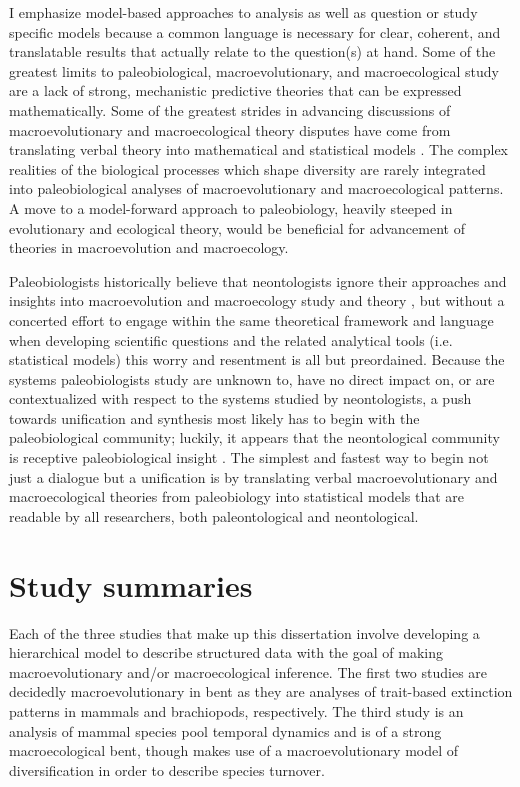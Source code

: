 I emphasize model-based approaches to analysis as well as question or study specific models because a common language is necessary for clear, coherent, and translatable results that actually relate to the question(s) at hand. Some of the greatest limits to paleobiological, macroevolutionary, and macroecological study are a lack of strong, mechanistic predictive theories that can be expressed mathematically. Some of the greatest strides in advancing discussions of macroevolutionary and macroecological theory disputes have come from translating verbal theory into mathematical and statistical models \citep{Raup1973,Nee1992,Felsenstein1985b,Hunt2006a,Hunt2007a,Shipley2006}. The complex realities of the biological processes which shape diversity are rarely integrated into paleobiological analyses of macroevolutionary and macroecological patterns. A move to a model-forward approach to paleobiology, heavily steeped in evolutionary and ecological theory, would be beneficial for advancement of theories in macroevolution and macroecology. 

Paleobiologists historically believe that neontologists ignore their approaches and insights into macroevolution and macroecology study and theory \citep{Sepkoski2009,Sepkoski2015}, but without a concerted effort to engage within the same theoretical framework and language when developing scientific questions and the related analytical tools (i.e. statistical models) this worry and resentment is all but preordained. Because the systems paleobiologists study are unknown to, have no direct impact on, or are contextualized with respect to the systems studied by neontologists, a push towards unification and synthesis most likely has to begin with the paleobiological community; luckily, it appears that the neontological community is receptive paleobiological insight \citep{Fritz2013a}. The simplest and fastest way to begin not just a dialogue but a unification is by translating verbal macroevolutionary and macroecological theories from paleobiology into statistical models that are readable by all researchers, both paleontological and neontological.


\section{Study summaries}  %

Each of the three studies that make up this dissertation involve developing a hierarchical model to describe structured data with the goal of making macroevolutionary and/or macroecological inference. The first two studies are decidedly macroevolutionary in bent as they are analyses of trait-based extinction patterns in mammals and brachiopods, respectively. The third study is an analysis of mammal species pool temporal dynamics and is of a strong macroecological bent, though makes use of a macroevolutionary model of diversification in order to describe species turnover.

